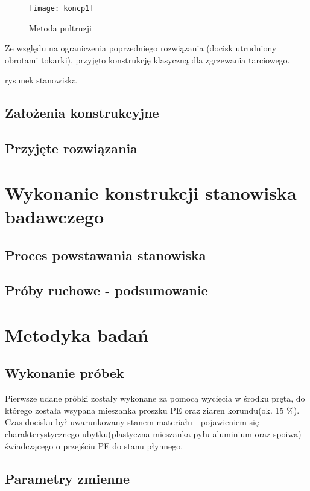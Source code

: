 \documentclass[magister,druk]{dyplom}
\begin{document}
\begin{figure}[H]
	\texttt{[image: koncp1]}
	\caption{Metoda pultruzji\cite{Chawla1998}}
\end{figure}

Ze względu na ograniczenia poprzedniego rozwiązania (docisk utrudniony obrotami tokarki), przyjęto konstrukcję klasyczną dla zgrzewania tarciowego.

 rysunek stanowiska

\section{Założenia konstrukcyjne}
\section{Przyjęte rozwiązania}

\chapter{Wykonanie konstrukcji stanowiska badawczego}

\section{Proces powstawania stanowiska}

\section{Próby ruchowe - podsumowanie}

\chapter{Metodyka badań}
\section{Wykonanie próbek}

Pierwsze udane próbki zostały wykonane za pomocą wycięcia w środku pręta, do którego została wsypana mieszanka proszku PE oraz ziaren korundu(ok. 15 \%). Czas docisku był uwarunkowany stanem materiału - pojawieniem się charakterystycznego ubytku(plastyczna mieszanka pyłu aluminium oraz spoiwa) świadczącego o przejściu PE do stanu płynnego. 

\section{Parametry zmienne}
\end{document}
